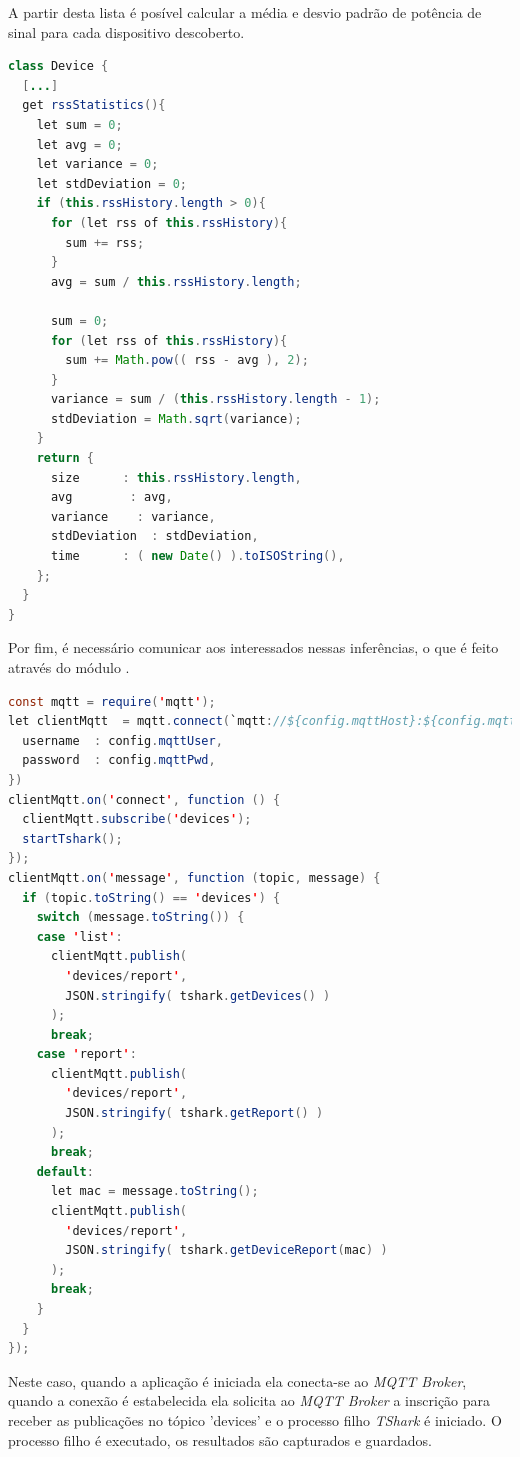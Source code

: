 A partir desta lista é posível calcular a média e desvio padrão de potência de
sinal para cada dispositivo descoberto.


\begin{lstlisting}[language=java]
class Device {
  [...]
  get rssStatistics(){
    let sum = 0;
    let avg = 0;
    let variance = 0;
    let stdDeviation = 0;
    if (this.rssHistory.length > 0){
      for (let rss of this.rssHistory){
        sum += rss;
      }
      avg = sum / this.rssHistory.length;

      sum = 0;
      for (let rss of this.rssHistory){
        sum += Math.pow(( rss - avg ), 2);
      }
      variance = sum / (this.rssHistory.length - 1);
      stdDeviation = Math.sqrt(variance);
    }
    return {
      size      : this.rssHistory.length,
      avg        : avg,
      variance    : variance,
      stdDeviation  : stdDeviation,
      time      : ( new Date() ).toISOString(),
    };
  }
}
\end{lstlisting}

Por fim, é necessário comunicar aos interessados nessas inferências, o que é
feito através do módulo .

\begin{lstlisting}[language=java]
const mqtt = require('mqtt');
let clientMqtt  = mqtt.connect(`mqtt://${config.mqttHost}:${config.mqttPort}`, {
  username  : config.mqttUser,
  password  : config.mqttPwd,
})
clientMqtt.on('connect', function () {
  clientMqtt.subscribe('devices');
  startTshark();
});
clientMqtt.on('message', function (topic, message) {
  if (topic.toString() == 'devices') {
    switch (message.toString()) {
    case 'list':
      clientMqtt.publish(
        'devices/report',
        JSON.stringify( tshark.getDevices() )
      );
      break;
    case 'report':
      clientMqtt.publish(
        'devices/report',
        JSON.stringify( tshark.getReport() )
      );
      break;
    default:
      let mac = message.toString();
      clientMqtt.publish(
        'devices/report',
        JSON.stringify( tshark.getDeviceReport(mac) )
      );
      break;
    }
  }
});
\end{lstlisting}

Neste caso, quando a aplicação é iniciada ela conecta-se ao \emph{MQTT Broker},
quando a conexão é estabelecida ela solicita ao \emph{MQTT Broker} a inscrição
para receber as publicações no tópico 'devices' e o processo filho \emph{TShark}
é iniciado. O processo filho é executado, os resultados são capturados e
guardados.

